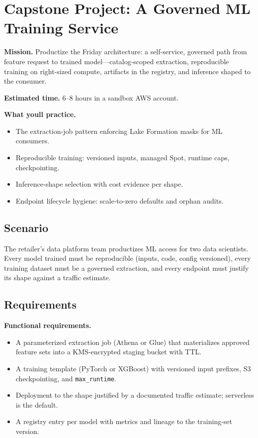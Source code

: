 \section{Capstone Project: A Governed ML Training Service}\label{sec:ch18-capstone}

\begin{capstonebox}
\textbf{Mission.} Productize the Friday architecture: a self-service, governed path from feature request to trained model---catalog-scoped extraction, reproducible training on right-sized compute, artifacts in the registry, and inference shaped to the consumer.

\textbf{Estimated time.} 6--8 hours in a sandbox AWS account.

\textbf{What you\textquotesingle{}ll practice.}
\begin{itemize}
    \item The extraction-job pattern enforcing Lake Formation masks for ML consumers.
    \item Reproducible training: versioned inputs, managed Spot, runtime caps, checkpointing.
    \item Inference-shape selection with cost evidence per shape.
    \item Endpoint lifecycle hygiene: scale-to-zero defaults and orphan audits.
\end{itemize}
\end{capstonebox}

\subsection*{Scenario}
The retailer's data platform team productizes ML access for two data scientists. Every model trained must be reproducible (inputs, code, config versioned), every training dataset must be a governed extraction, and every endpoint must justify its shape against a traffic estimate.

\subsection*{Requirements}
\textbf{Functional requirements.}
\begin{itemize}
    \item A parameterized extraction job (Athena or Glue) that materializes approved feature sets into a KMS-encrypted staging bucket with TTL.
    \item A training template (PyTorch or XGBoost) with versioned input prefixes, S3 checkpointing, and \texttt{max\_runtime}.
    \item Deployment to the shape justified by a documented traffic estimate; serverless is the default.
    \item A registry entry per model with metrics and lineage to the training-set version.
\end{itemize}

